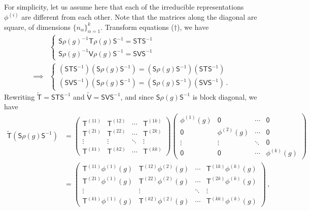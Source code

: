 \documentclass{article}
\theoremstyle{plain}\theoremheaderfont{\normalfont\itshape}\theorembodyfont{\rmfamily}\theoremseparator{.}\newtheorem*{rem}{Remark}\newtheorem*{ex}{Example}\newtheorem*{proof}{Proof}\newtheorem*{altp}{Alternative proof}
\theoremstyle{plain}\theoremheaderfont{\normalfont\bfseries}\theorembodyfont{\rmfamily}\theoremseparator{.}\newtheorem{thm}{Theorem}[section]\newtheorem{lem}[thm]{Lemma}\newtheorem{prop}[thm]{Proposition}\newtheorem*{cor}{Corollary}\newtheorem{defn}[thm]{Definition}\newtheorem{clm}[thm]{Claim}\newtheorem{clminproof}{Claim}
\theoremstyle{break}\theoremheaderfont{\normalfont\itshape}\theorembodyfont{\rmfamily}\theoremseparator{.\medskip}\newtheorem*{proofskip}{Proof}\newtheorem*{exs}{Examples}\newtheorem*{rems}{Remarks}
\theoremstyle{break}\theoremheaderfont{\normalfont\bfseries}\theorembodyfont{\rmfamily}\theoremseparator{.\medskip}\newtheorem{lemskip}[thm]{Lemma}\newtheorem{defnskip}[thm]{Definition}\newtheorem{propskip}[thm]{Proposition}\newtheorem{thmskip}[thm]{Theorem}
\numberwithin{equation}{section}
\begin{document}
	For simplicity, let us assume here that each of the irreducible representations \(\phi^{(i)}\) are different from each other. Note that the matrices along the diagonal are square, of dimensions \(\{n_\alpha\}_{\alpha=1}^{k}\). Transform equations (\(\dagger\)), we have
	\begin{align*}
		&\begin{cases}
			\mathsf{S}\rho(g)^{-1}\mathsf{T}\rho(g)\mathsf{S}^{-1}=\mathsf{S}\mathsf{T}\mathsf{S}^{-1}\\
			\mathsf{S}\rho(g)^{-1}\mathsf{V}\rho(g)\mathsf{S}^{-1}=\mathsf{S}\mathsf{V}\mathsf{S}^{-1}
		\end{cases}\\
		\implies &\begin{cases}
			(\mathsf{S}\mathsf{T}\mathsf{S}^{-1})(\mathsf{S}\rho(g)\mathsf{S}^{-1})=(\mathsf{S}\rho(g)\mathsf{S}^{-1})(\mathsf{S}\mathsf{T}\mathsf{S}^{-1})\\
			(\mathsf{S}\mathsf{V}\mathsf{S}^{-1})(\mathsf{S}\rho(g)\mathsf{S}^{-1})=(\mathsf{S}\rho(g)\mathsf{S}^{-1})(\mathsf{S}\mathsf{V}\mathsf{S}^{-1})\,.
		\end{cases}
	\end{align*}
	Rewriting \(\tilde{\mathsf{T}}=\mathsf{S}\mathsf{T}\mathsf{S}^{-1}\) and \(\tilde{\mathsf{V}}=\mathsf{S}\mathsf{V}\mathsf{S}^{-1}\), and since \(\mathsf{S}\rho(g)\mathsf{S}^{-1}\) is block diagonal, we have
	\begin{align*}
		\tilde{\mathsf{T}}(\mathsf{S}\rho(g)\mathsf{S}^{-1})&=\begin{pmatrix}
			\mathsf{T}^{(11)} & \mathsf{T}^{(12)} & \cdots & \mathsf{T}^{(1k)}\\
			\mathsf{T}^{(21)} & \mathsf{T}^{(22)} & \cdots & \mathsf{T}^{(2k)}\\
			\vdots & \vdots & \ddots & \vdots\\
			\mathsf{T}^{(k1)} & \mathsf{T}^{(k2)} & \cdots & \mathsf{T}^{(kk)}
		\end{pmatrix}\begin{pmatrix}
			\phi^{(1)}(g) & \mathsf{0} & \cdots & \mathsf{0}\\
			\mathsf{0} & \phi^{(2)}(g) & \cdots & \mathsf{0}\\
			\vdots & \vdots & \ddots & \mathsf{0}\\
			\mathsf{0} & \mathsf{0} & \cdots & \phi^{(k)}(g)
		\end{pmatrix}\\
		&=\begin{pmatrix}
			\mathsf{T}^{(11)}\phi^{(1)}(g) & \mathsf{T}^{(12)}\phi^{(2)}(g) & \cdots & \mathsf{T}^{(1k)}\phi^{(k)}(g)\\
			\mathsf{T}^{(21)}\phi^{(1)}(g) & \mathsf{T}^{(22)}\phi^{(2)}(g) & \cdots & \mathsf{T}^{(2k)}\phi^{(k)}(g)\\
			\vdots & \vdots & \ddots & \vdots\\
			\mathsf{T}^{(k1)}\phi^{(1)}(g) & \mathsf{T}^{(k2)}\phi^{(2)}(g) & \cdots & \mathsf{T}^{(kk)}\phi^{(k)}(g)
		\end{pmatrix}\,,
	\end{align*}
\end{document}
